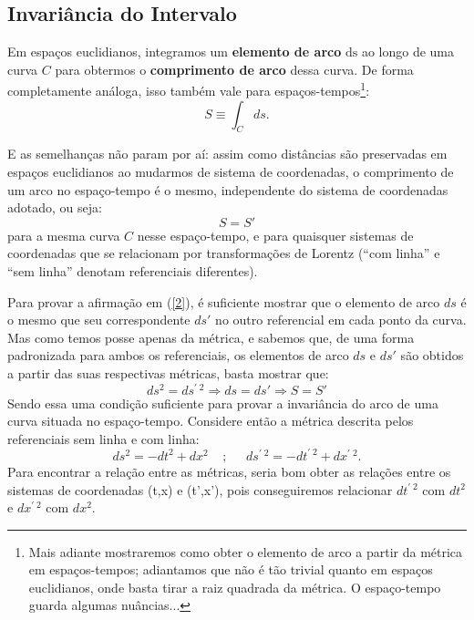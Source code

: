 \documentclass[12pt,a4paper]{article}
\begin{document}
\subsection{Invariância do Intervalo}

Em espaços euclidianos, integramos um \textbf{elemento de arco} $\mathrm{ds}$
ao longo de uma curva $C$ para obtermos o \textbf{comprimento de arco} dessa curva. De forma completamente análoga,
isso também vale para espaços-tempos\footnote{Mais adiante mostraremos como obter o elemento de arco a partir da métrica em espaços-tempos; adiantamos que não é tão trivial quanto em espaços euclidianos, onde basta tirar a raiz quadrada da métrica. O espaço-tempo guarda algumas nuâncias...}:
\begin{equation}
  S \equiv \int_{C} ds .
\end{equation}

E as semelhanças não param por aí: assim como distâncias são preservadas em espaços euclidianos ao mudarmos de sistema de coordenadas, o comprimento
de um arco no espaço-tempo é o mesmo, independente do sistema de coordenadas adotado, ou seja:
\begin{equation}
  S = S' 
  \label{2}
\end{equation}
para a mesma curva $C$ nesse espaço-tempo, e para quaisquer sistemas de coordenadas que se relacionam por
transformações de Lorentz (\enquote{com linha} e \enquote{sem linha} denotam referenciais diferentes). 

Para provar a afirmação em (\ref{2}), é suficiente mostrar que o elemento
de arco $ds$ é o mesmo que seu correspondente $ds'$ no outro referencial em cada ponto da curva. Mas como temos posse apenas da métrica,
e sabemos que, de uma forma padronizada para ambos os referenciais, os elementos de arco $ds$ e $ds'$ são obtidos a partir das suas respectivas métricas, basta mostrar que:
\begin{equation*}
  ds^2 = ds^{\prime \; 2} \Rightarrow ds = ds' \Rightarrow S = S'
\end{equation*}
Sendo essa uma condição suficiente para provar a invariância do arco de uma curva situada no
espaço-tempo. 
Considere então a métrica descrita pelos referenciais sem linha e com linha:
\begin{equation}
  ds^2 = -dt^2 + dx^2 \;\;\;\;;\;\;\;\;\; ds^{\prime\; 2} = -dt^{\prime\; 2} + dx^{\prime\; 2}.
  \label{eq:intervalos}
\end{equation}
Para encontrar a relação entre as métricas, seria bom obter as relações entre os sistemas de coordenadas (t,x) e (t',x'),
pois conseguiremos relacionar $dt^{\prime \; 2}$ com $dt^2$ e $dx^{\prime \; 2}$ com $dx^2$.
\end{document}
